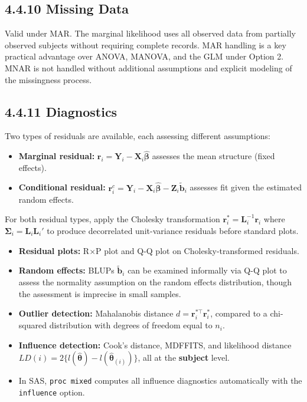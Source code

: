 \documentclass[11pt]{article}
\newcommand{\bY}{\mathbf{Y}}
\newcommand{\bX}{\mathbf{X}}
\newcommand{\bZ}{\mathbf{Z}}
\newcommand{\bbeta}{\boldsymbol{\beta}}
\newcommand{\bSigma}{\boldsymbol{\Sigma}}
\newcommand{\btheta}{\boldsymbol{\theta}}
\begin{document}
\subsection*{4.4.10 Missing Data}

Valid under MAR. The marginal likelihood uses all observed data from partially observed subjects without requiring complete records. MAR handling is a key practical advantage over ANOVA, MANOVA, and the GLM under Option 2. MNAR is not handled without additional assumptions and explicit modeling of the missingness process.

\subsection*{4.4.11 Diagnostics}

Two types of residuals are available, each assessing different assumptions:

\begin{itemize}[leftmargin=2em]
  \item \textbf{Marginal residual:} $\mathbf{r}_i = \bY_i - \bX_i\hat{\bbeta}$ assesses the mean structure (fixed effects).
  \item \textbf{Conditional residual:} $\mathbf{r}_i^c = \bY_i - \bX_i\hat{\bbeta} - \bZ_i\tilde{\mathbf{b}}_i$ assesses fit given the estimated random effects.
\end{itemize}

For both residual types, apply the Cholesky transformation $\mathbf{r}_i^* = \mathbf{L}_i^{-1}\mathbf{r}_i$ where $\bSigma_i = \mathbf{L}_i\mathbf{L}_i'$ to produce decorrelated unit-variance residuals before standard plots.

\begin{itemize}[leftmargin=2em]
  \item \textbf{Residual plots:} R$\times$P plot and Q-Q plot on Cholesky-transformed residuals.
  \item \textbf{Random effects:} BLUPs $\tilde{\mathbf{b}}_i$ can be examined informally via Q-Q plot to assess the normality assumption on the random effects distribution, though the assessment is imprecise in small samples.
  \item \textbf{Outlier detection:} Mahalanobis distance $d = \mathbf{r}_i^{*\top}\mathbf{r}_i^*$, compared to a chi-squared distribution with degrees of freedom equal to $n_i$.
  \item \textbf{Influence detection:} Cook's distance, MDFFITS, and likelihood distance $LD(i) = 2\{l(\hat{\btheta}) - l(\hat{\btheta}_{(i)})\}$, all at the \textbf{subject} level.
  \item In SAS, \texttt{proc mixed} computes all influence diagnostics automatically with the \texttt{influence} option.
\end{itemize}
\end{document}
